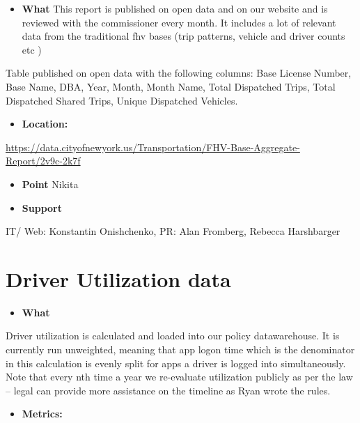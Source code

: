 \documentclass[
]{book}
\providecommand{\tightlist}{%
  \setlength{\itemsep}{0pt}\setlength{\parskip}{0pt}}
\begin{document}
\begin{itemize}
\tightlist
\item
  \textbf{What}
  This report is published on open data and on our website and is reviewed with the commissioner every month. It includes a lot of relevant data from the traditional fhv bases (trip patterns, vehicle and driver counts etc )
\end{itemize}

Table published on open data with the following columns: Base License Number, Base Name, DBA, Year, Month, Month Name, Total Dispatched Trips, Total Dispatched Shared Trips, Unique Dispatched Vehicles.

\begin{itemize}
\tightlist
\item
  \textbf{Location:}
\end{itemize}

\url{https://data.cityofnewyork.us/Transportation/FHV-Base-Aggregate-Report/2v9c-2k7f}

\begin{itemize}
\item
  \textbf{Point}
  Nikita
\item
  \textbf{Support}
\end{itemize}

IT/ Web: Konstantin Onishchenko, PR: Alan Fromberg, Rebecca Harshbarger

\hypertarget{driver-utilization-data}{%
\section{Driver Utilization data}\label{driver-utilization-data}}

\begin{itemize}
\tightlist
\item
  \textbf{What}
\end{itemize}

Driver utilization is calculated and loaded into our policy datawarehouse. It is currently run unweighted, meaning that app logon time which is the denominator in this calculation is evenly split for apps a driver is logged into simultaneously. Note that every nth time a year we re-evaluate utilization publicly as per the law -- legal can provide more assistance on the timeline as Ryan wrote the rules.

\begin{itemize}
\tightlist
\item
  \textbf{Metrics:}
\end{itemize}
\end{document}
